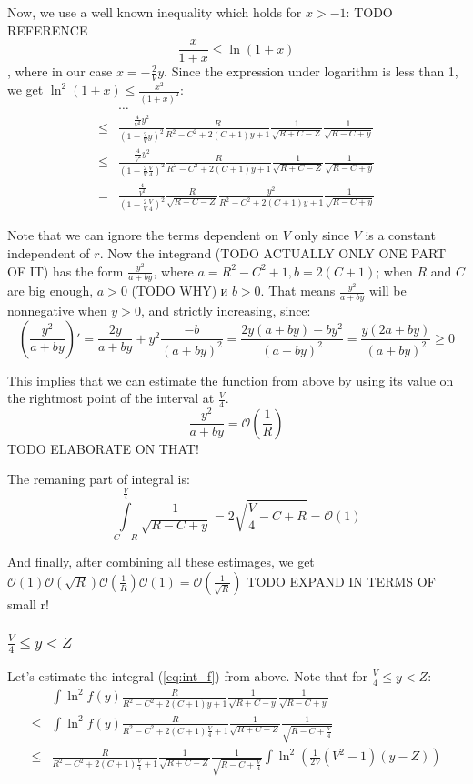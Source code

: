 \documentclass[12pt, a4paper]{article}
\theoremstyle{plain}
\newcommand{\mcO}{\mathcal{O}} %
\begin{document}
Now, we use a well known inequality which holds for $x > -1$: TODO REFERENCE
\[
\frac{x}{1 + x} \le \ln (1 + x)
\]
, where in our case $x = -\frac{2}{V} y$. Since the expression under logarithm is less than 1, we get $\ln^2 (1 + x) \le \frac{x^2}{(1 + x)^2}$:
\begin{align*}
       & \dots 
\\ \le & \frac{\frac{4}{V^2}y^2}{(1 - \frac{2}{V}y)^2}  \frac{R}{R^2 - C^2 + 2 (C + 1) y + 1} \frac{1}{\sqrt{R + C - Z}} \frac{1}{\sqrt{R - C + y}}
\\ \le & \frac{\frac{4}{V^2}y^2}{(1 - \frac{2}{V} \frac{V}{4})^2}  \frac{R}{R^2 - C^2 + 2 (C + 1) y + 1} \frac{1}{\sqrt{R + C - Z}} \frac{1}{\sqrt{R - C + y}}
\\ = & \frac{\frac{4}{V^2}}{(1 - \frac{2}{V} \frac{V}{4})^2} \frac{R}{\sqrt{R + C - Z}} \frac{y^2}{R^2 - C^2 + 2 (C + 1) y + 1}  \frac{1}{\sqrt{R - C + y}}
\end{align*}

Note that we can ignore the terms dependent on $V$ only since $V$ is a constant independent of $r$. Now the integrand (TODO ACTUALLY ONLY ONE PART OF IT) has the form $\frac{y^2}{a + b y}$, where $a = R^2 - C^2 + 1, b = 2 (C + 1)$; when $R$ and $C$ are big enough, $a > 0$ (TODO WHY) и $b > 0$. That means $\frac{y^2}{a + b y}$ will be nonnegative when $y > 0$, and strictly increasing, since:
\[
  \left(\frac{y^2}{a + b y}\right)'
= \frac{2y}{a + by} + y^2 \frac{-b}{(a + by)^2}
= \frac{2y (a + by) - b y^2}{(a + by)^2}
= \frac{y (2a + by)}{(a + by)^2}
\ge 0
\]

This implies that we can estimate the function from above by using its value on the rightmost point of the interval at $\frac{V}{4}$.
\[
\frac{y^2}{a + b y} = \mcO\left(\frac{1}{R}\right)
\]
TODO ELABORATE ON THAT!

The remaning part of integral is:
\[
\int\limits_{C - R}^{\frac{V}{4}} \frac{1}{\sqrt{R - C + y}} = 2 \sqrt{\frac{V}{4} - C + R} = \mcO(1)
\]

And finally, after combining all these estimages, we get $\mcO(1) \mcO(\sqrt{R}) \mcO\left(\frac{1}{R}\right) \mcO(1)  = \mcO\left(\frac{1}{\sqrt{R}}\right)$ TODO EXPAND IN TERMS OF small r!

\subsubsection{$\frac{V}{4} \le y < Z$}

Let's estimate the integral (\ref{eq:int_f}) from above. Note that for $\frac{V}{4} \le y < Z$:
\begin{align*}
       & \int \ln^2 f(y) \frac{R}{R^2 - C^2 + 2 (C + 1) y + 1} \frac{1}{\sqrt{R + C - y}} \frac{1}{\sqrt{R - C + y}} 
\\ \le & \int \ln^2 f(y) \frac{R}{R^2 - C^2 + 2 (C + 1) \frac{V}{4} + 1} \frac{1}{\sqrt{R + C - Z}} \frac{1}{\sqrt{R - C + \frac{V}{4}}}
\\ \le &  \frac{R}{R^2 - C^2 + 2 (C + 1) \frac{V}{4} + 1} \frac{1}{\sqrt{R + C - Z}} \frac{1}{\sqrt{R - C + \frac{V}{4}}} \int \ln^2 \left( \frac{1}{2 V}(V^2 - 1) (y - Z) \right)
\end{align*}
\end{document}
